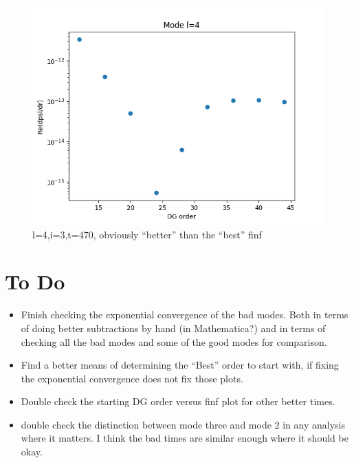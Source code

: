\documentclass{article}
\begin{document}
\begin{figure}
  \includegraphics{subtractoffsett470l4i3}
  \caption{l=4,i=3,t=470, obviously ``better'' than the ``best'' finf}
\end{figure}
    

\section{To Do}

\begin{itemize}
\item Finish checking the exponential convergence of the bad
  modes. Both in terms of doing better subtractions by hand (in
  Mathematica?) and in terms of checking all the bad modes and some of
  the good modes for comparison.
\item Find a better means of determining the ``Best'' order to start with, if fixing the exponential convergence does not fix those plots.
\item Double check the starting DG order versus finf plot for other better times.

  \item double check the distinction between mode three and mode 2 in any analysis where it matters. I think the bad times are similar enough where it should be okay. 

\end{itemize}
\end{document}
